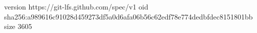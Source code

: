version https://git-lfs.github.com/spec/v1
oid sha256:a989616c91028d459273df5a0d6afa06b56c62edf78e774dedbfdec8151801bb
size 3605
